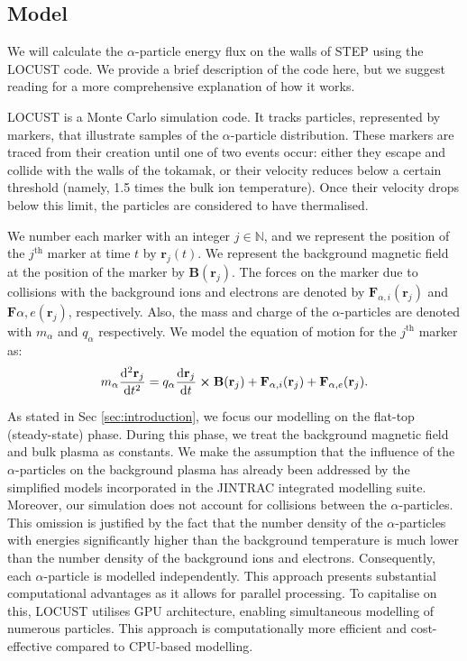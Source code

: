 \documentclass[10pt, a4paper, twoside]{article}
\begin{document}
\subsection{Model}

We will calculate the $\alpha$-particle energy flux on the walls of STEP using the LOCUST code. We provide a brief description of the code here, but we suggest reading \cite{akers2018, ward2021} for a more comprehensive explanation of how it works.

LOCUST is a Monte Carlo simulation code. It tracks particles, represented by markers, that illustrate samples of the $\alpha$-particle distribution. These markers are traced from their creation until one of two events occur: either they escape and collide with the walls of the tokamak, or their velocity reduces below a certain threshold (namely, 1.5 times the bulk ion temperature). Once their velocity drops below this limit, the particles are considered to have thermalised.

We number each marker with an integer $j \in \mathbb{N}$, and we represent the position of the $j^{\text{th}}$ marker at time $t$ by $\textbf{r}_j(t)$.
We represent the background magnetic field at the position of the marker by $\textbf{B}(\textbf{r}_j)$.
The forces on the marker due to collisions with the background ions and electrons are denoted by $\textbf{F}_{\alpha,i}(\textbf{r}_j)$ and $\textbf{F}{\alpha,e}(\textbf{r}_j)$, respectively.
Also, the mass and charge of the $\alpha$-particles are denoted with $m_\alpha$ and $q_\alpha$ respectively.
We model the equation of motion for the $j^{\text{th}}$ marker as:
\begin{equation}
m_\alpha\dv[2]{\textbf{r}_j}{t} = q_\alpha\dv{\textbf{r}_j}{t}\cross\textbf{B}(\textbf{r}_j) + \textbf{F}_{\alpha,i}(\textbf{r}_j) + \textbf{F}_{\alpha,e}(\textbf{r}_j).
\end{equation}

As stated in Sec \ref{sec:introduction}, we focus our modelling on the flat-top (steady-state) phase. During this phase, we treat the background magnetic field and bulk plasma as constants. We make the assumption that the influence of the $\alpha$-particles on the background plasma has already been addressed by the simplified models incorporated in the JINTRAC integrated modelling suite.
Moreover, our simulation does not account for collisions between the $\alpha$-particles. This omission is justified by the fact that the number density of the $\alpha$-particles with energies significantly higher than the background temperature is much lower than the number density of the background ions and electrons. Consequently, each $\alpha$-particle is modelled independently. This approach presents substantial computational advantages as it allows for parallel processing.
To capitalise on this, LOCUST utilises GPU architecture, enabling simultaneous modelling of numerous particles. This approach is computationally more efficient and cost-effective compared to CPU-based modelling.
\end{document}
